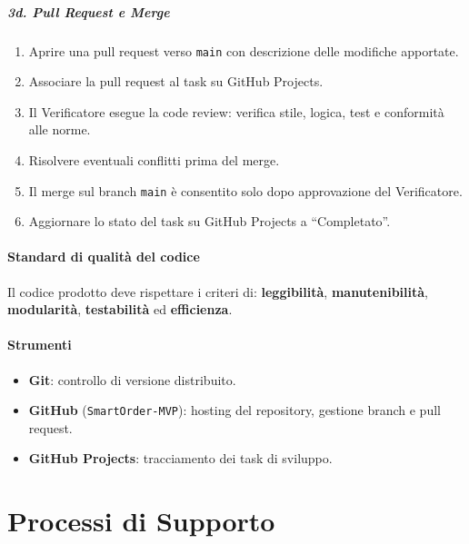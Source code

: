 \documentclass[a4paper, 11pt, oneside]{scrartcl}
\begin{document}
\subparagraph{3d. Pull Request e Merge}
\begin{enumerate}
    \item Aprire una pull request{\scriptsize{}} verso \texttt{main} con descrizione delle modifiche apportate.
    \item Associare la pull request al task su GitHub Projects.
    \item Il Verificatore esegue la code review: verifica stile, logica, test e conformità alle norme.
    \item Risolvere eventuali conflitti prima del merge.
    \item Il merge sul branch \texttt{main} è consentito solo dopo approvazione del Verificatore.
    \item Aggiornare lo stato del task su GitHub Projects a ``Completato''.
\end{enumerate}

\paragraph{Standard di qualità del codice}
Il codice prodotto deve rispettare i criteri di: \textbf{leggibilità}, \textbf{manutenibilità}, \textbf{modularità}, \textbf{testabilità} ed \textbf{efficienza}.

\paragraph{Strumenti}
\begin{itemize}
    \item \textbf{Git}: controllo di versione distribuito.
    \item \textbf{GitHub} (\texttt{SmartOrder-MVP}): hosting del repository, gestione branch e pull request.
    \item \textbf{GitHub Projects}: tracciamento dei task di sviluppo.
\end{itemize}

\newpage
\section{Processi di Supporto}

\end{document}
